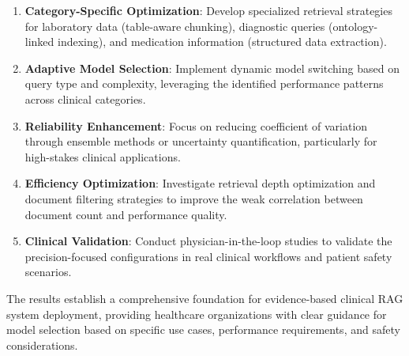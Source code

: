 \begin{enumerate}
    \item \textbf{Category-Specific Optimization}: Develop specialized retrieval strategies for laboratory data (table-aware chunking), diagnostic queries (ontology-linked indexing), and medication information (structured data extraction).

    \item \textbf{Adaptive Model Selection}: Implement dynamic model switching based on query type and complexity, leveraging the identified performance patterns across clinical categories.

    \item \textbf{Reliability Enhancement}: Focus on reducing coefficient of variation through ensemble methods or uncertainty quantification, particularly for high-stakes clinical applications.

    \item \textbf{Efficiency Optimization}: Investigate retrieval depth optimization and document filtering strategies to improve the weak correlation between document count and performance quality.

    \item \textbf{Clinical Validation}: Conduct physician-in-the-loop studies to validate the precision-focused configurations in real clinical workflows and patient safety scenarios.
\end{enumerate}

The results establish a comprehensive foundation for evidence-based clinical RAG system deployment, providing healthcare organizations with clear guidance for model selection based on specific use cases, performance requirements, and safety considerations.